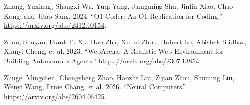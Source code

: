 \documentclass{article}
\newlength{\cslhangindent}
\newenvironment{CSLReferences}[2]
 {%
  \setlength{\parindent}{0pt}
  \everypar{\setlength{\hangindent}{\cslhangindent}}\ignorespaces
 }
 {\par}
\begin{document}
\begin{CSLReferences}{1}{0}
\leavevmode{}%
Zhang, Yuxiang, Shangxi Wu, Yuqi Yang, Jiangming Shu, Jinlin Xiao, Chao
Kong, and Jitao Sang. 2024. {``O1-Coder: An O1 Replication for
Coding.''} \url{https://arxiv.org/abs/2412.00154}.

\leavevmode{}%
Zhou, Shuyan, Frank F. Xu, Hao Zhu, Xuhui Zhou, Robert Lo, Abishek
Sridhar, Xianyi Cheng, et al. 2023. {``WebArena: A Realistic Web
Environment for Building Autonomous Agents.''}
\url{https://arxiv.org/abs/2307.13854}.

\leavevmode{}%
Zhuge, Mingchen, Changsheng Zhao, Haozhe Liu, Zijian Zhou, Shuming Liu,
Wenyi Wang, Ernie Chang, et al. 2026. {``Neural Computers.''}
\url{https://arxiv.org/abs/2604.06425}.

\end{CSLReferences}
\end{document}

